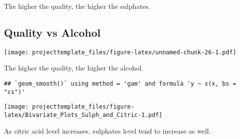 \documentclass[]{article}
\newenvironment{Shaded}{\begin{snugshade}}{\end{snugshade}}
\newcommand{\KeywordTok}[1]{\textcolor[rgb]{0.13,0.29,0.53}{\textbf{#1}}}
\newcommand{\DataTypeTok}[1]{\textcolor[rgb]{0.13,0.29,0.53}{#1}}
\newcommand{\DecValTok}[1]{\textcolor[rgb]{0.00,0.00,0.81}{#1}}
\newcommand{\StringTok}[1]{\textcolor[rgb]{0.31,0.60,0.02}{#1}}
\newcommand{\OtherTok}[1]{\textcolor[rgb]{0.56,0.35,0.01}{#1}}
\newcommand{\OperatorTok}[1]{\textcolor[rgb]{0.81,0.36,0.00}{\textbf{#1}}}
\newcommand{\NormalTok}[1]{#1}
\begin{document}
The higher the quality, the higher the sulphates.

\subsection{Quality vs Alcohol}\label{quality-vs-alcohol}

\texttt{[image: projecttemplate\_files/figure-latex/unnamed-chunk-26-1.pdf]}

The higher the quality, the higher the alcohol.

\begin{Shaded}
\end{Shaded}

\begin{verbatim}
## `geom_smooth()` using method = 'gam' and formula 'y ~ s(x, bs = "cs")'
\end{verbatim}

\texttt{[image: projecttemplate\_files/figure-latex/Bivariate\_Plots\_Sulph\_and\_Citric-1.pdf]}

As citric acid level increases, sulphates level tend to increase as
well.

\begin{Shaded}
\end{Shaded}
\end{document}
